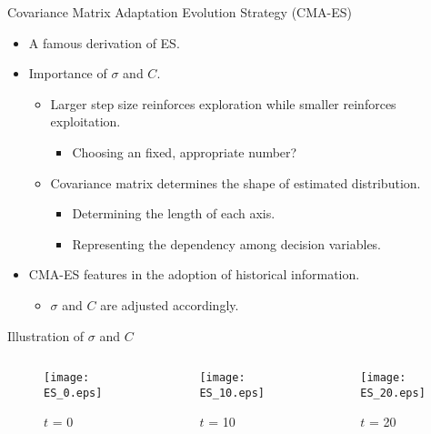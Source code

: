 \begin{frame}{Covariance Matrix Adaptation Evolution Strategy (CMA-ES)}
  \begin{itemize}
    \item A famous derivation of ES.
      \vspace*{14pt}
    \item Importance of $\sigma$ and $C$.
      \begin{itemize}
        \item Larger step size reinforces exploration while smaller
          reinforces exploitation.
          \begin{itemize}
            \item Choosing an fixed, appropriate number?
          \end{itemize}
        \item Covariance matrix determines the shape of estimated
          distribution.
          \begin{itemize}
            \item Determining the length of each axis.
            \item Representing the dependency among decision variables.
          \end{itemize}
      \end{itemize}
          \vspace*{14pt}
        \item CMA-ES features in the adoption of historical information.
          \begin{itemize}
            \item $\sigma$ and $C$ are adjusted accordingly.
          \end{itemize}
  \end{itemize}
\end{frame}

\begin{frame}{Illustration of $\sigma$ and $C$}
  \begin{columns}
    \begin{column}{.33\textwidth}
      \begin{figure}
        \centering
        \texttt{[image: ES\_0.eps]}
        \caption{$t$ = 0}
      \end{figure}
    \end{column}
    \begin{column}{.33\textwidth}
      \begin{figure}
        \centering
        \texttt{[image: ES\_10.eps]}
        \caption{$t$ = 10}
      \end{figure}
    \end{column}
    \begin{column}{.33\textwidth}
      \begin{figure}
        \centering
        \texttt{[image: ES\_20.eps]}
        \caption{$t$ = 20}
      \end{figure}
    \end{column}
  \end{columns}
\end{frame}


